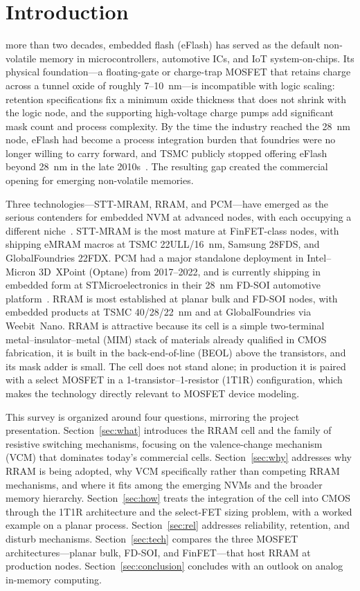 \documentclass[lettersize,journal]{IEEEtran}
\begin{document}
\section{Introduction}
 more than two decades, embedded flash (eFlash) has served as the default non-volatile memory in microcontrollers, automotive ICs, and IoT system-on-chips. Its physical foundation---a floating-gate or charge-trap MOSFET that retains charge across a tunnel oxide of roughly 7--10~nm---is incompatible with logic scaling: retention specifications fix a minimum oxide thickness that does not shrink with the logic node, and the supporting high-voltage charge pumps add significant mask count and process complexity. By the time the industry reached the 28~nm node, eFlash had become a process integration burden that foundries were no longer willing to carry forward, and TSMC publicly stopped offering eFlash beyond 28~nm in the late 2010s~\cite{ref_hellenbrand2024}. The resulting gap created the commercial opening for emerging non-volatile memories.

Three technologies---STT-MRAM, RRAM, and PCM---have emerged as the serious contenders for embedded NVM at advanced nodes, with each occupying a different niche~\cite{ref_hellenbrand2024}. STT-MRAM is the most mature at FinFET-class nodes, with shipping eMRAM macros at TSMC 22ULL/16~nm, Samsung 28FDS, and GlobalFoundries 22FDX. PCM had a major standalone deployment in Intel--Micron 3D~XPoint (Optane) from 2017--2022, and is currently shipping in embedded form at STMicroelectronics in their 28~nm FD-SOI automotive platform~\cite{ref_hellenbrand2024}. RRAM is most established at planar bulk and FD-SOI nodes, with embedded products at TSMC 40/28/22~nm and at GlobalFoundries via Weebit~Nano. RRAM is attractive because its cell is a simple two-terminal metal--insulator--metal (MIM) stack of materials already qualified in CMOS fabrication, it is built in the back-end-of-line (BEOL) above the transistors, and its mask adder is small. The cell does not stand alone; in production it is paired with a select MOSFET in a 1-transistor--1-resistor (1T1R) configuration, which makes the technology directly relevant to MOSFET device modeling.

This survey is organized around four questions, mirroring the project presentation. Section~\ref{sec:what} introduces the RRAM cell and the family of resistive switching mechanisms, focusing on the valence-change mechanism (VCM) that dominates today's commercial cells. Section~\ref{sec:why} addresses why RRAM is being adopted, why VCM specifically rather than competing RRAM mechanisms, and where it fits among the emerging NVMs and the broader memory hierarchy. Section~\ref{sec:how} treats the integration of the cell into CMOS through the 1T1R architecture and the select-FET sizing problem, with a worked example on a planar process. Section~\ref{sec:rel} addresses reliability, retention, and disturb mechanisms. Section~\ref{sec:tech} compares the three MOSFET architectures---planar bulk, FD-SOI, and FinFET---that host RRAM at production nodes. Section~\ref{sec:conclusion} concludes with an outlook on analog in-memory computing.
\end{document}
